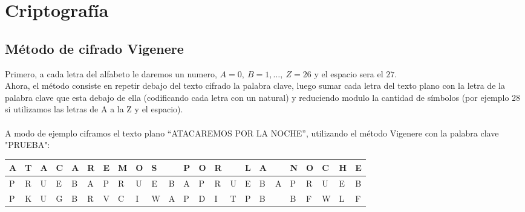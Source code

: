 \documentclass{report}
\begin{document}
\chapter{Criptografía}\section{Método de cifrado Vigenere}
Primero, a cada letra del alfabeto le daremos un numero, $A=0,\ B=1,\dots,\ Z=26$ y el espacio sera el $27$.
\\Ahora, el método consiste en repetir debajo del texto cifrado la palabra clave, luego sumar cada letra del texto plano con la letra de la palabra clave que esta debajo de ella (codificando cada letra con un natural) y reduciendo modulo la cantidad de símbolos (por ejemplo 28 si utilizamos las letras de A a la Z y el espacio).
\\\\A modo de ejemplo ciframos el texto plano ``ATACAREMOS POR LA NOCHE'', utilizando el método Vigenere con la palabra clave "PRUEBA":
\begin{table}[h]
\begin{tabular}{|l|l|l|l|l|l|l|l|l|l|l|l|l|l|l|l|l|l|l|l|l|l|l|}
\hline
A & T & A & C & A & R & E & M & O & S &   & P & O & R &   & L & A &   & N & O & C & H & E \\ \hline
P & R & U & E & B & A & P & R & U & E & B & A & P & R & U & E & B & A & P & R & U & E & B \\ \hline
P & K & U & G & B & R & V & C & I & W & A & P & D & I & T & P & B &   & B & F & W & L & F \\ \hline
\end{tabular}
\end{table}
\end{document}
